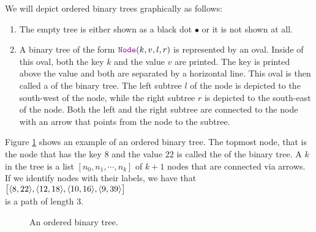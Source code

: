 \noindent
We will depict ordered binary trees graphically as follows:
\begin{enumerate}
\item The empty tree  is either shown as a black dot $\bullet$ or it is not shown at all.
\item A binary tree of the form $\mytt{Node}(k,v,l,r)$ is represented by an oval.  Inside of this
      oval, both the key $k$ and the value $v$ are printed.  The key is printed above the value and
      both are separated by a horizontal line.  This oval is then called a
        of the binary tree. 
      The left subtree $l$ of the node is depicted to the south-west of the node,
      while the right subtree $r$ is depicted to the south-east of the node.  Both the left
      and the right subtree are connected to the node with an arrow that points from the node to the
      subtree.
\end{enumerate}
Figure \ref{fig:graph1} shows an example of an ordered binary tree.  The topmost node, that is the
node that has the key $8$ and the value $22$ is called the   of the binary tree.
A  $k$ in the tree is a list $[n_0,n_1, \cdots, n_k]$ of
$k+1$ nodes that are connected via arrows.  If we identify nodes with their labels, we have that
\\[0.2cm]
\hspace*{1.3cm} $\bigl[ \pair(8,22), \pair(12,18), \pair(10,16), \pair(9,39) \bigr]$ \\[0.2cm]
is a path of length 3.


\begin{figure}[!ht]
  \centering
  \caption{An ordered binary tree.}
  \label{fig:graph1}
\end{figure}


